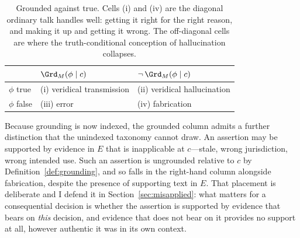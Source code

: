 \begin{table}[ht]
  \centering
  \begin{tabular}{@{}lll@{}}
    \toprule
     & $\Grd_M(\phi \mid c)$ & $\neg\,\Grd_M(\phi \mid c)$ \\
    \midrule
    $\phi$ true
      & (i) veridical transmission
      & (ii) veridical hallucination \\
    $\phi$ false
      & (iii) error
      & (iv) fabrication \\
    \bottomrule
  \end{tabular}
  \caption{Grounded against true. Cells (i) and (iv) are the diagonal ordinary
    talk handles well: getting it right for the right reason, and making it up
    and getting it wrong. The off-diagonal cells are where the truth-conditional
    conception of hallucination collapses.}
  \label{tab:taxonomy}
\end{table}

Because grounding is now indexed, the grounded column admits a further
distinction that the unindexed taxonomy cannot draw. An assertion may be
supported by evidence in $E$ that is inapplicable at $c$---stale, wrong
jurisdiction, wrong intended use. Such an assertion is ungrounded relative to $c$
by Definition~\ref{def:grounding}, and so falls in the right-hand column
alongside fabrication, despite the presence of supporting text in $E$. That
placement is deliberate and I defend it in Section~\ref{sec:misapplied}: what
matters for a consequential decision is whether the assertion is supported by
evidence that bears on \emph{this} decision, and evidence that does not bear on
it provides no support at all, however authentic it was in its own context.
